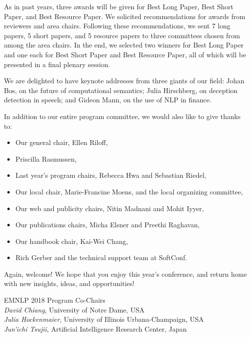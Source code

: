 As in past years, three awards will be given for Best Long Paper, Best Short Paper, and Best Resource Paper. We solicited recommendations for awards from reviewers and area chairs. Following these recommendations, we sent 7 long papers, 5 short papers, and 5 resource papers to three committees chosen from among the area chairs. In the end, we selected two winners for Best Long Paper and one each for Best Short Paper and Best Resource Paper, all of which will be presented in a final plenary session.

We are delighted to have keynote addresses from three giants of our field: Johan Bos, on the future of computational semantics; Julia Hirschberg, on deception detection in speech; and Gideon Mann, on the use of NLP in finance.

\clearpage

In addition to our entire program committee, we would also like to give thanks to:

\begin{itemize}
    \item         Our general chair, Ellen Riloff,
    \item Priscilla Rasmussen,
    \item Last year's program chairs, Rebecca Hwa and Sebastian Riedel,
    \item Our local chair, Marie-Francine Moens, and the local organizing committee,
\item Our web and publicity chairs, Nitin Madnani and Mohit Iyyer,
\item Our publications chairs, Micha Elsner and Preethi Raghavan,
\item Our handbook chair, Kai-Wei Chang,
\item Rich Gerber and the technical support team at SoftConf.
\end{itemize}
Again, welcome! We hope that you enjoy this year's conference, and return home with new insights, ideas, and opportunities!

\vspace{3em}

\noindent EMNLP 2018 Program Co-Chairs \\


\noindent \textit{David Chiang}, University of Notre Dame, USA \\
\noindent \textit{Julia Hockenmaier}, University of Illinois Urbana-Champaign, USA\\
\noindent \textit{Jun'ichi Tsujii}, Artificial Intelligence Research Center, Japan

